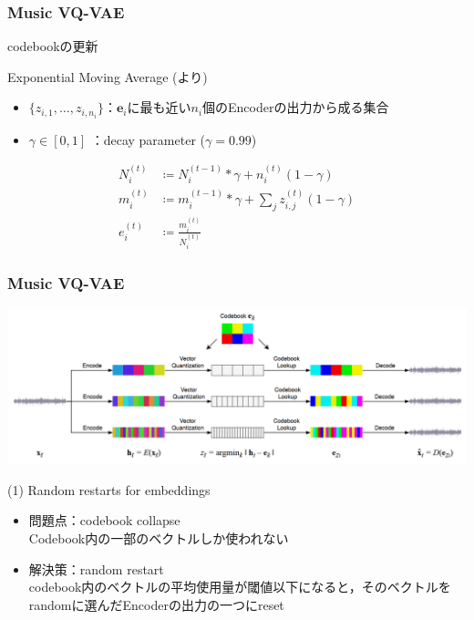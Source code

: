 \documentclass[dvipdfmx]{beamer}
\begin{document}
\begin{frame}
    \frametitle{Music VQ-VAE}
    codebookの更新
    \vspace{\baselineskip}

    Exponential Moving Average {(\footnotesize \cite{ndrl}より)}
    \begin{itemize}
        \item $\{ z_{i,1}, \ldots , z_{i,n_i}\}$：$\bm{e}_i$に最も近い$n_i$個のEncoderの出力から成る集合
        \item $\gamma \in \left[0, 1\right]$ ：decay parameter ($\gamma = 0.99$)
    \end{itemize}
    \begin{align*}
        N_{i}^{(t)} &\coloneqq N_{i}^{(t-1)} \ast \gamma + n_{i}^{(t)} (1-\gamma) \\
        m_{i}^{(t)} &\coloneqq m_{i}^{(t-1)} \ast \gamma + \sum_{j} z_{i,j}^{(t)} (1-\gamma) \\
        e_{i}^{(t)} &\coloneqq \frac{m_{i}^{(t)}}{N_{i}^{(t)}}
    \end{align*}
\end{frame}


\begin{frame}
    \frametitle{Music VQ-VAE}
    \begin{center}
        \includegraphics[scale=0.20]{figure/musicvqvae.png}
    \end{center}

    (1) Random restarts for embeddings
    \begin{itemize}
        \item 問題点：codebook collapse \\
        Codebook内の一部のベクトルしか使われない
        \item 解決策：random restart \\
        codebook内のベクトルの平均使用量が閾値以下になると，そのベクトルをrandomに選んだEncoderの出力の一つにreset
    \end{itemize}
\end{frame}
\end{document}
